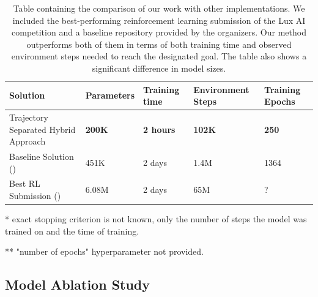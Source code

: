 \bigskip


\begin{table}[htbp]
    \footnotesize
    \renewcommand{\arraystretch}{1.2}%
    \begin{threeparttable}
        \begin{tabularx}{\linewidth}{|X|C{2.0cm}|C{2.0cm}|C{2.0cm}|C{2.0cm}|}
            \hline
            \textbf{Solution} & \textbf{Parameters}  & \textbf{Training time} & \textbf{Environment Steps} & \textbf{Training Epochs} \\
            \hline
            Trajectory Separated Hybrid Approach & \textbf{200K} & \textbf{2 hours} & \textbf{102K} & \textbf{250} \\
            Baseline Solution (\cite{luxai_s2-baseline-source}) & 451K & 2 days & 1.4M & 1364 \\
            Best RL Submission (\cite{ferdinand}) & 6.08M & 2 days\tnote{*} & 65M\tnote{*} & ?\tnote{**} \\
            \hline
        \end{tabularx}
        \begin{tablenotes}
            \item[*] exact stopping criterion is not known, only the number of steps the model was trained on and the time of training.
            \item[**] "number of epochs" hyperparameter not provided.
        \end{tablenotes}
        \captionsetup{justification=justified, singlelinecheck=false, width=1\linewidth, labelfont=bf} 
        \caption{Table containing the comparison of our work with other implementations. We included the best-performing reinforcement learning submission of the Lux AI competition and a baseline repository provided by the organizers. Our method outperforms both of them in terms of both training time and observed environment steps needed to reach the designated goal. The table also shows a significant difference in model sizes.}
        \label{tab:other-work-comparisons}
    \end{threeparttable}
\end{table}


\subsection{Model Ablation Study}
\label{subsec:ablation}


